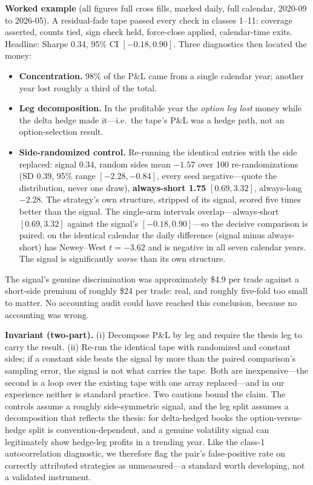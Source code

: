 \documentclass[11pt]{article}
\begin{document}
\textbf{Worked example} (all figures full cross fills, marked daily, full calendar,
2020-09 to 2026-05). A residual-fade tape passed every check in classes 1--11: coverage
asserted, counts tied, sign check held, force-close applied, calendar-time exits. Headline:
Sharpe 0.34, 95\% CI $[-0.18, 0.90]$. Three diagnostics then located the money:
\begin{itemize}\itemsep0.05em
\item \textbf{Concentration.} 98\% of the P\&L came from a single calendar year; another year
lost roughly a third of the total.
\item \textbf{Leg decomposition.} In the profitable year the \emph{option leg lost} money while
the delta hedge made it---i.e.\ the tape's P\&L was a hedge path, not an option-selection
result.
\item \textbf{Side-randomized control.} Re-running the identical entries with the side
replaced: signal 0.34, random sides mean $-1.57$ over 100 re-randomizations (SD 0.39, 95\%
range $[-2.28, -0.84]$, every seed negative---quote the distribution, never one draw),
\textbf{always-short 1.75} $[0.69, 3.32]$,
always-long $-2.28$. The strategy's own structure, stripped of its signal, scored five times
better than the signal. The single-arm intervals overlap---always-short
$[0.69, 3.32]$ against the signal's $[-0.18, 0.90]$---so the decisive comparison is paired:
on the identical calendar the daily difference (signal minus always-short) has Newey--West
$t = -3.62$ and is negative in all seven calendar years. The signal is significantly
\emph{worse} than its own structure.
\end{itemize}
The signal's genuine discrimination was approximately \$4.9 per trade against a short-side
premium of roughly \$24 per trade: real, and roughly five-fold too small to matter. No
accounting audit could have reached this conclusion, because no accounting was wrong.

\textbf{Invariant (two-part).} (i) Decompose P\&L by leg and require the thesis leg to carry
the result. (ii) Re-run the identical tape with randomized and constant sides; if a constant
side beats the signal by more than the paired comparison's sampling error, the signal is not
what carries the tape. Both are inexpensive---the second is a loop over the
existing tape with one array replaced---and in our experience neither is standard practice.
Two cautions bound the claim. The controls assume a roughly side-symmetric signal, and the leg
split assumes a decomposition that reflects the thesis: for delta-hedged books the
option-versus-hedge split is convention-dependent, and a genuine volatility signal can
legitimately show hedge-leg profits in a trending year. Like the class-1 autocorrelation
diagnostic, we therefore flag the pair's false-positive rate on correctly attributed
strategies as unmeasured---a standard worth developing, not a validated instrument.
\end{document}
